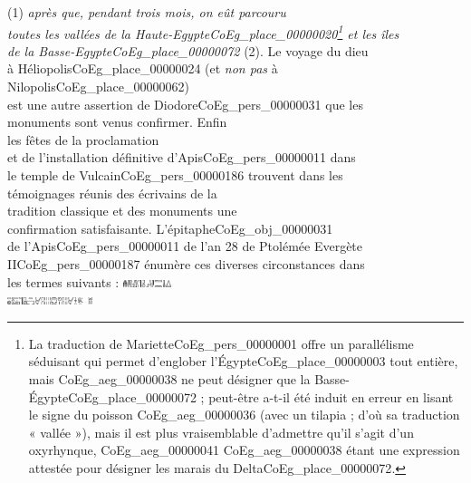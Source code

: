 \documentclass{book}
\begin{document}
{\begin{paracol}{2}
(1) \textit{après que, pendant trois mois, on eût parcouru\\
toutes les vallées de la Haute-Egypte\gls{CoEg_place_00000020}\footnote{La traduction de Mariette\gls{CoEg_pers_00000001} offre un parallélisme séduisant qui permet d’englober l’Égypte\gls{CoEg_place_00000003} tout entière, mais \foreignlanguage{translit}{\gls{CoEg_aeg_00000038}} ne peut désigner que la Basse-Égypte\gls{CoEg_place_00000072} ; peut-être a-t-il été induit en erreur en lisant le signe du poisson \foreignlanguage{translit}{\gls{CoEg_aeg_00000036}} (avec un tilapia ; d’où sa traduction « vallée »), mais il est plus vraisemblable d’admettre qu’il s’agit d’un oxyrhynque, \foreignlanguage{translit}{\gls{CoEg_aeg_00000041} \gls{CoEg_aeg_00000038}} étant une expression attestée pour désigner les marais du Delta\gls{CoEg_place_00000072}.} et les îles\\
de la Basse-Egypte\gls{CoEg_place_00000072}} (2). Le voyage du dieu\\
à Héliopolis\gls{CoEg_place_00000024} (et \textit{non pas} à Nilopolis\gls{CoEg_place_00000062})\\
est une autre assertion de Diodore\gls{CoEg_pers_00000031} que les\\
monuments sont venus confirmer. Enfin\\
les fêtes de la proclamation\\
et de l’installation définitive d’Apis\gls{CoEg_pers_00000011} dans\\
le temple de Vulcain\gls{CoEg_pers_00000186} trouvent dans les\\
témoignages réunis des écrivains de la\\
tradition classique et des monuments une\\
confirmation satisfaisante. L’épitaphe\gls{CoEg_obj_00000031}\\
de l’Apis\gls{CoEg_pers_00000011} de l’an 28 de Ptolémée Evergète\\
II\gls{CoEg_pers_00000187} énumère ces diverses circonstances dans\\
les termes suivants : \includegraphics[height=6pt]{CoEg_Mariette_hiero_1857-04-01_7_2_1.png}\\
\includegraphics[height=6pt]{CoEg_Mariette_hiero_1857-04-01_7_2_2.png}\\

\end{paracol}}
\end{document}
